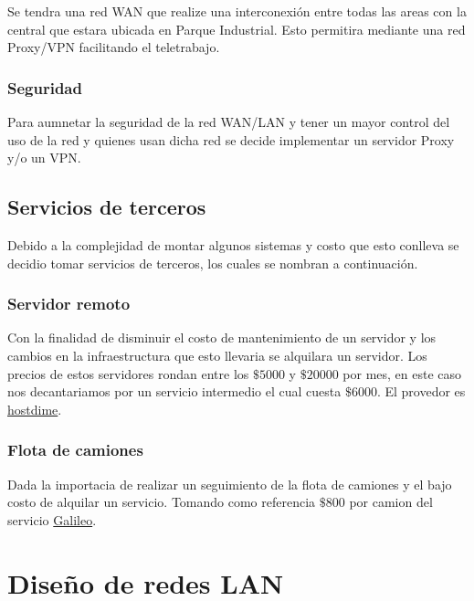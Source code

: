 \documentclass[11pt]{article}
\begin{document}
        Se tendra una red WAN que realize una interconexión entre todas las areas con la central que estara ubicada en Parque Industrial.
        Esto permitira mediante una red Proxy/VPN facilitando el teletrabajo.

        \subsubsection*{Seguridad}

        Para aumnetar la seguridad de la red WAN/LAN y tener un mayor control del uso de la red y quienes usan dicha red 
        se decide implementar un servidor Proxy y/o un VPN.

        \subsection{Servicios de terceros}

        Debido a la complejidad de montar algunos sistemas y costo que esto conlleva se decidio tomar servicios de terceros, los 
        cuales se nombran a continuación.

        \subsubsection*{Servidor remoto}

        Con la finalidad de disminuir el costo de mantenimiento de un servidor y los cambios en la infraestructura que esto llevaria se 
        alquilara un servidor. Los precios de estos servidores rondan entre los $\$5000$ y $\$20000$ por mes, en este 
        caso nos decantariamos por un servicio intermedio el cual cuesta $\$6000$. El provedor es \href{https://www.hostdime.com.ar/servidores-dedicados}{hostdime}.

        \subsubsection*{Flota de camiones}

        Dada la importacia de realizar un seguimiento de la flota de camiones y el bajo costo de alquilar un servicio.
        Tomando como referencia $\$800$ por camion del servicio \href{https://galileosatelital.com/rastreo-vehicular-gps}{Galileo}.
        
    \section{Diseño de redes LAN}
\end{document}
